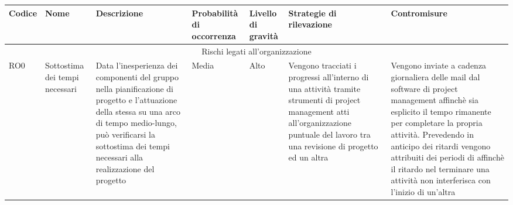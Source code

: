 \documentclass[../PianodiProgetto.tex]{subfiles}
\begin{document}
\begin{longtable}{|p{15mm}|p{23.5mm}|p{38mm}|p{22mm}|p{19mm}|p{30mm}|p{30mm}|}
		\hline \textbf{Codice} & \textbf{Nome} & \textbf{Descrizione} & \textbf{Probabilità di occorrenza} & \textbf{Livello di gravità} & \textbf{Strategie di rilevazione} & \textbf{Contromisure} \\

		\hline \multicolumn{7}{|c|}{Rischi legati all'organizzazione} \\
		
		\hline RO0 & Sottostima dei tempi necessari & Data l'inesperienza dei componenti del gruppo nella pianificazione di progetto e l'attuazione della stessa su una arco di tempo medio-lungo, può verificarsi la sottostima dei tempi necessari alla realizzazione del progetto & Media & Alto & Vengono tracciati i progressi all'interno di una attività tramite strumenti di project management atti all'organizzazione puntuale del lavoro tra una revisione di progetto ed un altra & Vengono inviate a cadenza giornaliera delle mail dal software di project management affinchè sia esplicito il tempo rimanente per completare la propria attività. Prevedendo in anticipo dei ritardi vengono attribuiti dei periodi di \glossario{slack}{Slack} affinchè il ritardo nel terminare una attività non interferisca con l'inizio di un'altra \\

		\hline

	\end{longtable}
\end{document}
